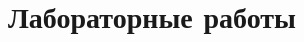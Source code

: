 \usepackage[utf8x]{inputenc}
\section{Лабораторные
работы}\label{ux43bux430ux431ux43eux440ux430ux442ux43eux440ux43dux44bux435-ux440ux430ux431ux43eux442ux44b}
